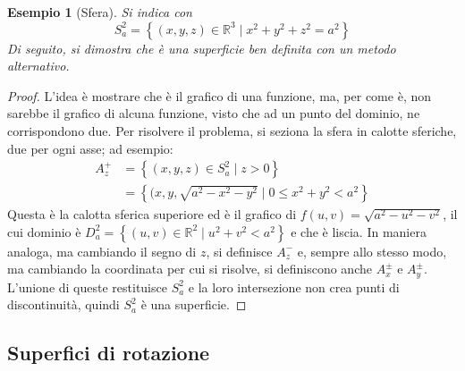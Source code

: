 \documentclass[12pt]{scrartcl}
\theoremstyle{style}
\newtheorem{esempio}{Esempio}[section]
\numberwithin{equation}{subsection}
\begin{document}
\begin{esempio}
	[Sfera]
	Si indica con 
	\[
	S^2_a = \left\{ (x,y,z) \in \mathbb{R}^3  \mid x^2 + y^2 + z^2 = a^2 \right\} 
	\] 
	Di seguito, si dimostra che \`e una superficie ben definita con un metodo alternativo.
\end{esempio}
\begin{proof}
	L'idea \`e mostrare che \`e il grafico di una funzione, ma, per come \`e, non sarebbe il grafico di alcuna funzione, visto che ad un punto del dominio, ne corrispondono due.
	Per risolvere il problema, si seziona la sfera in calotte sferiche, due per ogni asse; ad esempio:
	\[
		\begin{split}
			A_z^+ &= \left\{ (x,y,z) \in S_a^2  \mid z >0 \right\} \\
			      &= \left\{ (x,y,\sqrt{a^2 - x^2 - y^2}  \mid 0 \le x^2 + y^2 < a^2 \right\} 
		\end{split}
	\] 
	Questa \`e la calotta sferica superiore ed \`e il grafico di $f (u,v) = \sqrt{a^2 - u ^2 - v^2} $, il cui dominio \`e $D^2 _a = \left\{ (u,v) \in \mathbb{R}^2  \mid u^2 + v^2 < a^2 \right\} $ e che \`e liscia.
	In maniera analoga, ma cambiando il segno di $z$, si definisce $A^-_z$ e, sempre allo stesso modo, ma cambiando la coordinata per cui si risolve, si definiscono anche $A^{\pm} _x$ e $A^{\pm} _y$.
	L'unione di queste restituisce $S^2_a$ e la loro intersezione non crea punti di discontinuit\`a, quindi $S^2_a$ \`e una superficie.
\end{proof}
\subsection{Superfici di rotazione}
\end{document}
